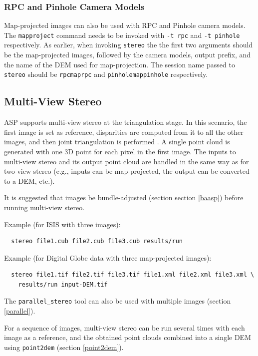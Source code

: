 \subsubsection{RPC and Pinhole Camera Models}

Map-projected images can also be used with RPC and Pinhole camera
models. The \texttt{mapproject} command needs to be invoked with
\texttt{-t rpc} and \texttt{-t pinhole} respectively. As earlier, when
invoking \texttt{stereo} the the first two arguments should be the
map-projected images, followed by the camera models, output prefix, and
the name of the DEM used for map-projection. The session name passed to
\texttt{stereo} should be \texttt{rpcmaprpc} and
\texttt{pinholemappinhole} respectively.

\subsection{Multi-View Stereo}
\label{multiview}

ASP supports multi-view stereo at the triangulation stage.  In this
scenario, the first image is set as reference, disparities are
computed from it to all the other images, and then joint triangulation
is performed \cite{slabaugh2001optimal}. A single
point cloud is generated with one 3D point for each pixel in the first
image. The inputs to multi-view stereo and its output point cloud are
handled in the same way as for two-view stereo (e.g., inputs can be
map-projected, the output can be converted to a DEM, etc.).

It is suggested that images be bundle-adjusted (section section
\ref{baasp}) before running multi-view stereo.

Example (for ISIS with three images):
\begin{verbatim}
  stereo file1.cub file2.cub file3.cub results/run
\end{verbatim}

Example (for Digital Globe data with three map-projected images):
\begin{verbatim}
  stereo file1.tif file2.tif file3.tif file1.xml file2.xml file3.xml \
    results/run input-DEM.tif
\end{verbatim}

The \texttt{parallel\_stereo} tool can also be used with multiple images
(section \ref{parallel}).

For a sequence of images, multi-view stereo can be run several times
with each image as a reference, and the obtained point clouds combined
into a single DEM using \texttt{point2dem} (section \ref{point2dem}).


